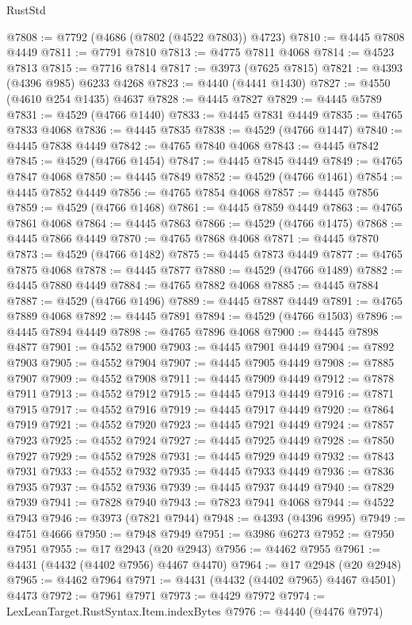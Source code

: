 \begin{lexlean}{RustStd}
\begin{coremodule}
@7808 := @7792 (@4686 (@7802 (@4522 @7803)) @4723)
@7810 := @4445 @7808 @4449
@7811 := @7791 @7810
@7813 := @4775 @7811 @4068
@7814 := @4523 @7813
@7815 := @7716 @7814
@7817 := @3973 (@7625 @7815)
@7821 := @4393 (@4396 @985) @6233 @4268
@7823 := @4440 (@4441 @1430)
@7827 := @4550 (@4610 @254 @1435) @4637
@7828 := @4445 @7827
@7829 := @4445 @5789
@7831 := @4529 (@4766 @1440)
@7833 := @4445 @7831 @4449
@7835 := @4765 @7833 @4068
@7836 := @4445 @7835
@7838 := @4529 (@4766 @1447)
@7840 := @4445 @7838 @4449
@7842 := @4765 @7840 @4068
@7843 := @4445 @7842
@7845 := @4529 (@4766 @1454)
@7847 := @4445 @7845 @4449
@7849 := @4765 @7847 @4068
@7850 := @4445 @7849
@7852 := @4529 (@4766 @1461)
@7854 := @4445 @7852 @4449
@7856 := @4765 @7854 @4068
@7857 := @4445 @7856
@7859 := @4529 (@4766 @1468)
@7861 := @4445 @7859 @4449
@7863 := @4765 @7861 @4068
@7864 := @4445 @7863
@7866 := @4529 (@4766 @1475)
@7868 := @4445 @7866 @4449
@7870 := @4765 @7868 @4068
@7871 := @4445 @7870
@7873 := @4529 (@4766 @1482)
@7875 := @4445 @7873 @4449
@7877 := @4765 @7875 @4068
@7878 := @4445 @7877
@7880 := @4529 (@4766 @1489)
@7882 := @4445 @7880 @4449
@7884 := @4765 @7882 @4068
@7885 := @4445 @7884
@7887 := @4529 (@4766 @1496)
@7889 := @4445 @7887 @4449
@7891 := @4765 @7889 @4068
@7892 := @4445 @7891
@7894 := @4529 (@4766 @1503)
@7896 := @4445 @7894 @4449
@7898 := @4765 @7896 @4068
@7900 := @4445 @7898 @4877
@7901 := @4552 @7900
@7903 := @4445 @7901 @4449
@7904 := @7892 @7903
@7905 := @4552 @7904
@7907 := @4445 @7905 @4449
@7908 := @7885 @7907
@7909 := @4552 @7908
@7911 := @4445 @7909 @4449
@7912 := @7878 @7911
@7913 := @4552 @7912
@7915 := @4445 @7913 @4449
@7916 := @7871 @7915
@7917 := @4552 @7916
@7919 := @4445 @7917 @4449
@7920 := @7864 @7919
@7921 := @4552 @7920
@7923 := @4445 @7921 @4449
@7924 := @7857 @7923
@7925 := @4552 @7924
@7927 := @4445 @7925 @4449
@7928 := @7850 @7927
@7929 := @4552 @7928
@7931 := @4445 @7929 @4449
@7932 := @7843 @7931
@7933 := @4552 @7932
@7935 := @4445 @7933 @4449
@7936 := @7836 @7935
@7937 := @4552 @7936
@7939 := @4445 @7937 @4449
@7940 := @7829 @7939
@7941 := @7828 @7940
@7943 := @7823 @7941 @4068
@7944 := @4522 @7943
@7946 := @3973 (@7821 @7944)
@7948 := @4393 (@4396 @995)
@7949 := @4751 @4666
@7950 := @7948 @7949
@7951 := @3986 @6273
@7952 := @7950 @7951
@7955 := @17 @2943 (@20 @2943)
@7956 := @4462 @7955
@7961 := @4431 (@4432 (@4402 @7956) @4467 @4470)
@7964 := @17 @2948 (@20 @2948)
@7965 := @4462 @7964
@7971 := @4431 (@4432 (@4402 @7965) @4467 @4501) @4473
@7972 := @7961 @7971
@7973 := @4429 @7972
@7974 := LexLeanTarget.RustSyntax.Item.indexBytes
@7976 := @4440 (@4476 @7974)

\end{coremodule}
\end{lexlean}
